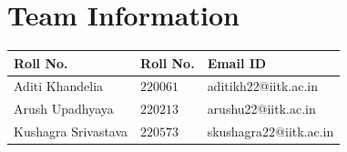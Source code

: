 \section*{Team Information}

\begin{table}[H]
  \centering
  \begin{tabular}{lll}
    \toprule
    \textbf{Roll No.} & \textbf{Roll No.} & \textbf{Email ID} \\
    \midrule
    Aditi Khandelia & $220061$ & aditikh22@iitk.ac.in \\
    Arush Upadhyaya & $220213$ & arushu22@iitk.ac.in \\ 
    Kushagra Srivastava & $220573$ & skushagra22@iitk.ac.in \\  
    \bottomrule
  \end{tabular}
  \label{tab:table1}
\end{table}
